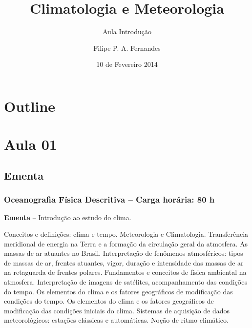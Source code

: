 \title[Aula 01]{Climatologia e Meteorologia}
\subtitle{Aula Introdução}
\author[Filipe Fernandes]{Filipe P. A. Fernandes}
\date[Fevereiro 2014]{10 de Fevereiro 2014}




\begin{frame}[plain]
  \titlepage
\end{frame}

\section*{Outline}
\begin{frame}
\tableofcontents
\end{frame}


\section{Aula 01}
\subsection{Ementa}
\begin{frame}
    \frametitle{Oceanografia Física Descritiva -- Carga horária: 80 h}
    {\bf Ementa} -- Introdução ao estudo do clima.
    {\scriptsize
    \begin{block}{}
    Conceitos e definições: clima e tempo.
    Meteorologia e Climatologia.  Transferência meridional de energia na Terra e
    a formação da circulação geral da atmosfera.  As massas de ar atuantes no
    Brasil.  Interpretação de fenômenos atmosféricos: tipos de massas de ar,
    frentes atuantes, vigor, duração e intensidade das massas de ar na
    retaguarda de frentes polares.  Fundamentos e conceitos de física ambiental
    na atmosfera.  Interpretação de imagens de satélites, acompanhamento das
    condições do tempo.  Os elementos do clima e os fatores geográficos de
    modificação das condições do tempo.  Os elementos do clima e os fatores
    geográficos de modificação das condições iniciais do clima.  Sistemas de
    aquisição de dados meteorológicos: estações clássicas e automáticas.
    Noção de ritmo climático.
    \end{block}
    }
\end{frame}

